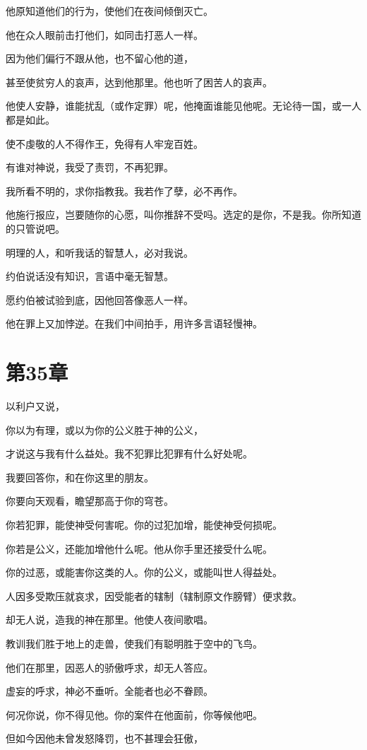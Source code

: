 \documentclass[12pt,oneside]{book}
\begin{document}
他原知道他们的行为，使他们在夜间倾倒灭亡。

他在众人眼前击打他们，如同击打恶人一样。

因为他们偏行不跟从他，也不留心他的道，

甚至使贫穷人的哀声，达到他那里。他也听了困苦人的哀声。

他使人安静，谁能扰乱（或作定罪）呢，他掩面谁能见他呢。无论待一国，或一人都是如此。

使不虔敬的人不得作王，免得有人牢宠百姓。

有谁对神说，我受了责罚，不再犯罪。

我所看不明的，求你指教我。我若作了孽，必不再作。

他施行报应，岂要随你的心愿，叫你推辞不受吗。选定的是你，不是我。你所知道的只管说吧。

明理的人，和听我话的智慧人，必对我说。

约伯说话没有知识，言语中毫无智慧。

愿约伯被试验到底，因他回答像恶人一样。

他在罪上又加悖逆。在我们中间拍手，用许多言语轻慢神。


\chapter{第35章}
以利户又说，

你以为有理，或以为你的公义胜于神的公义，

才说这与我有什么益处。我不犯罪比犯罪有什么好处呢。

我要回答你，和在你这里的朋友。

你要向天观看，瞻望那高于你的穹苍。

你若犯罪，能使神受何害呢。你的过犯加增，能使神受何损呢。

你若是公义，还能加增他什么呢。他从你手里还接受什么呢。

你的过恶，或能害你这类的人。你的公义，或能叫世人得益处。

人因多受欺压就哀求，因受能者的辖制（辖制原文作膀臂）便求救。

却无人说，造我的神在那里。他使人夜间歌唱。

教训我们胜于地上的走兽，使我们有聪明胜于空中的飞鸟。

他们在那里，因恶人的骄傲呼求，却无人答应。

虚妄的呼求，神必不垂听。全能者也必不眷顾。

何况你说，你不得见他。你的案件在他面前，你等候他吧。

但如今因他未曾发怒降罚，也不甚理会狂傲，
\end{document}
